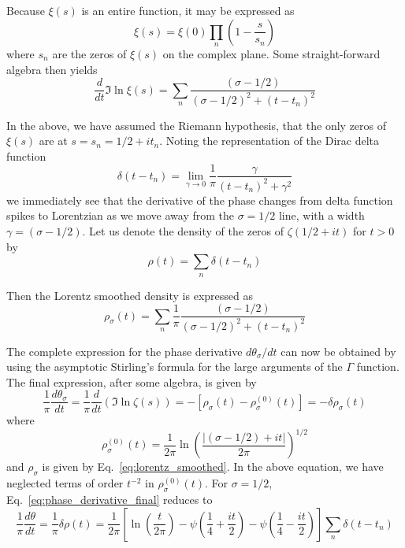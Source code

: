 \documentclass[11pt]{article}
\theoremstyle{plain}
\begin{document}
Because $\xi(s)$ is an entire function, it may be expressed as \cite{edwards1974}
\begin{equation}
\xi(s) = \xi(0) \prod_n \left(1 - \frac{s}{s_n}\right)
\label{eq:xi_product}
\end{equation}
where $s_n$ are the zeros of $\xi(s)$ on the complex plane. Some straight-forward algebra then yields
\begin{equation}
\frac{d}{dt} \Im \ln \xi(s) = \sum_n \frac{(\sigma - 1/2)}{(\sigma-1/2)^2 + (t-t_n)^2}
\label{eq:xi_derivative}
\end{equation}

In the above, we have assumed the Riemann hypothesis, that the only zeros of $\xi(s)$ are at $s = s_n = 1/2+ it_n$. Noting the representation of the Dirac delta function
\begin{equation}
\delta(t - t_n) = \lim_{\gamma \to 0} \frac{1}{\pi} \frac{\gamma}{(t-t_n)^2 + \gamma^2}
\label{eq:delta_representation}
\end{equation}
we immediately see that the derivative of the phase changes from delta function spikes to Lorentzian as we move away from the $\sigma = 1/2$ line, with a width $\gamma = (\sigma - 1/2)$. Let us denote the density of the zeros of $\zeta(1/2 + it)$ for $t > 0$ by
\begin{equation}
\rho(t) = \sum_n \delta(t-t_n)
\label{eq:zero_density_def}
\end{equation}

Then the Lorentz smoothed density is expressed as
\begin{equation}
\rho_\sigma(t) = \sum_n \frac{1}{\pi} \frac{(\sigma-1/2)}{(\sigma-1/2)^2 + (t-t_n)^2}
\label{eq:lorentz_smoothed}
\end{equation}

The complete expression for the phase derivative $d\theta_\sigma/dt$ can now be obtained by using the asymptotic Stirling's formula for the large arguments of the $\Gamma$ function. The final expression, after some algebra, is given by
\begin{equation}
\frac{1}{\pi} \frac{d\theta_\sigma}{dt} = \frac{1}{\pi} \frac{d}{dt}(\Im \ln \zeta(s)) = -[\rho_\sigma(t) - \rho_\sigma^{(0)}(t)] = -\delta\rho_\sigma(t)
\label{eq:phase_derivative_final}
\end{equation}
where
\begin{equation}
\rho_\sigma^{(0)}(t) = \frac{1}{2\pi} \ln \left(\frac{|(\sigma-1/2) + it|}{2\pi}\right)^{1/2}
\label{eq:smooth_density}
\end{equation}
and $\rho_\sigma$ is given by Eq.~\eqref{eq:lorentz_smoothed}. In the above equation, we have neglected terms of order $t^{-2}$ in $\rho_\sigma^{(0)}(t)$. For $\sigma = 1/2$, Eq.~\eqref{eq:phase_derivative_final} reduces to
\begin{equation}
\frac{1}{\pi} \frac{d\theta}{dt} = \frac{1}{\pi} \delta\rho(t) = \frac{1}{2\pi} \left[\ln \left(\frac{t}{2\pi}\right) - \psi\left(\frac{1}{4} + \frac{it}{2}\right) - \psi\left(\frac{1}{4} - \frac{it}{2}\right)\right] \sum_n \delta(t-t_n)
\label{eq:phase_derivative_half}
\end{equation}
\end{document}
